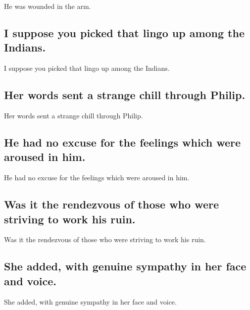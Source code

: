 \documentclass[]{article}
\begin{document}
He was wounded in the arm.

\hypertarget{i-suppose-you-picked-that-lingo-up-among-the-indians.}{%
\subsection{I suppose you picked that lingo up among the
Indians.}\label{i-suppose-you-picked-that-lingo-up-among-the-indians.}}

I suppose you picked that lingo up among the Indians.

\hypertarget{her-words-sent-a-strange-chill-through-philip.}{%
\subsection{Her words sent a strange chill through
Philip.}\label{her-words-sent-a-strange-chill-through-philip.}}

Her words sent a strange chill through Philip.

\hypertarget{he-had-no-excuse-for-the-feelings-which-were-aroused-in-him.}{%
\subsection{He had no excuse for the feelings which were aroused in
him.}\label{he-had-no-excuse-for-the-feelings-which-were-aroused-in-him.}}

He had no excuse for the feelings which were aroused in him.

\hypertarget{was-it-the-rendezvous-of-those-who-were-striving-to-work-his-ruin.}{%
\subsection{Was it the rendezvous of those who were striving to work his
ruin.}\label{was-it-the-rendezvous-of-those-who-were-striving-to-work-his-ruin.}}

Was it the rendezvous of those who were striving to work his ruin.

\hypertarget{she-added-with-genuine-sympathy-in-her-face-and-voice.}{%
\subsection{She added, with genuine sympathy in her face and
voice.}\label{she-added-with-genuine-sympathy-in-her-face-and-voice.}}

She added, with genuine sympathy in her face and voice.
\end{document}
